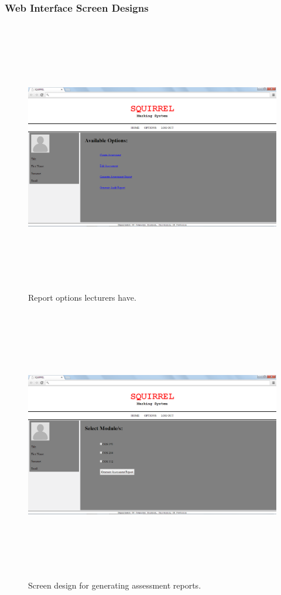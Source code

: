 \documentclass[12pt]{article}
\begin{document}
	\subsubsection{Web Interface Screen Designs}
	
		\begin{figure}[htbp]
		\centering
		\includegraphics[width=1.0\linewidth, height=12cm]{./Diagrams/web_lecturerOptions}
		\caption{Report options lecturers have.}
		\label{fig:web_lecturerOptions}
		\end{figure}
	
		\begin{figure}[htbp]
		\centering
		\includegraphics[width=1.0\linewidth, height=12cm]{./Diagrams/web_assessmentReport}
		\caption{Screen design for generating assessment reports.}
		\label{fig:web_assessmentReport}
		\end{figure}
\end{document}
